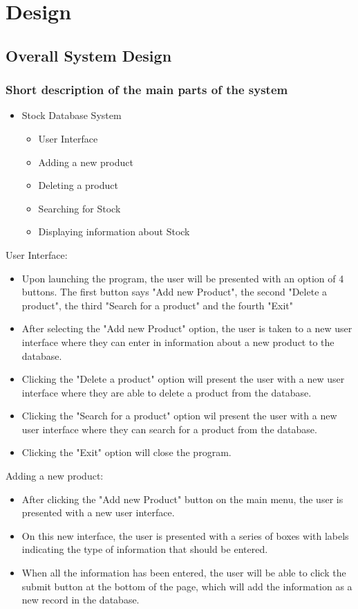 \chapter{Design}

\section{Overall System Design}

\subsection{Short description of the main parts of the system}
\begin{itemize}
	\item Stock Database System
	\begin{itemize}
		\item User Interface
		\item Adding a new product
		\item Deleting a product
		\item Searching for Stock
		\item Displaying information about Stock
	\end{itemize}
\end{itemize}

User Interface:
\begin{itemize}
	\item Upon launching the program, the user will be presented with an option of 4 buttons. The first button says "Add new Product", the second "Delete a product", the third "Search for a product" and the fourth "Exit"
	\item After selecting the "Add new Product" option, the user is taken to a new user interface where they can enter in information about a new product to the database.
	\item Clicking the "Delete a product" option will present the user with a new user interface where they are able to delete a product from the database.
	\item Clicking the "Search for a product" option wil present the user with a new user interface where they can search for a product from the database.
	\item Clicking the "Exit" option will close the program.
\end{itemize}
Adding a new product:
\begin{itemize}
	\item After clicking the "Add new Product" button on the main menu, the user is presented with a new user interface.
	\item On this new interface, the user is presented with a series of boxes with labels indicating the type of information that should be entered.
	\item When all the information has been entered, the user will be able to click the submit button at the bottom of the page, which will add the information as a new record in the database.
\end{itemize}

